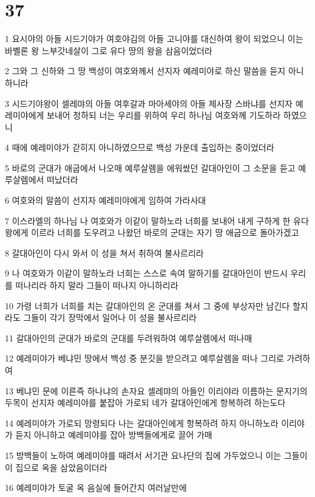 \chapter{37}

\par 1 요시야의 아들 시드기야가 여호야김의 아들 고니야를 대신하여 왕이 되었으니 이는 바벨론 왕 느부갓네살이 그로 유다 땅의 왕을 삼음이었더라
\par 2 그와 그 신하와 그 땅 백성이 여호와께서 선지자 예레미야로 하신 말씀을 듣지 아니하니라
\par 3 시드기야왕이 셀레먀의 아들 여후갈과 마아세야의 아들 제사장 스바냐를 선지자 예레미야에게 보내어 청하되 너는 우리를 위하여 우리 하나님 여호와께 기도하라 하였으니
\par 4 때에 예레미야가 갇히지 아니하였으므로 백성 가운데 출입하는 중이었더라
\par 5 바로의 군대가 애굽에서 나오매 예루살렘을 에워쌌던 갈대아인이 그 소문을 듣고 예루살렘에서 떠났더라
\par 6 여호와의 말씀이 선지자 예레미야에게 임하여 가라사대
\par 7 이스라엘의 하나님 나 여호와가 이같이 말하노라 너희를 보내어 내게 구하게 한 유다 왕에게 이르라 너희를 도우려고 나왔던 바로의 군대는 자기 땅 애굽으로 돌아가겠고
\par 8 갈대아인이 다시 와서 이 성을 쳐서 취하여 불사르리라
\par 9 나 여호와가 이같이 말하노라 너희는 스스로 속여 말하기를 갈대아인이 반드시 우리를 떠나리라 하지 말라 그들이 떠나지 아니하리라
\par 10 가령 너희가 너희를 치는 갈대아인의 온 군대를 쳐서 그 중에 부상자만 남긴다 할지라도 그들이 각기 장막에서 일어나 이 성을 불사르리라
\par 11 갈대아인의 군대가 바로의 군대를 두려워하여 예루살렘에서 떠나매
\par 12 예레미야가 베냐민 땅에서 백성 중 분깃을 받으려고 예루살렘을 떠나 그리로 가려하여
\par 13 베냐민 문에 이른즉 하나냐의 손자요 셀레먀의 아들인 이리야라 이름하는 문지기의 두목이 선지자 예레미야를 붙잡아 가로되 네가 갈대아인에게 항복하려 하는도다
\par 14 예레미야가 가로되 망령되다 나는 갈대아인에게 항복하려 하지 아니하노라 이리야가 듣지 아니하고 예레미야를 잡아 방백들에게로 끌어 가매
\par 15 방백들이 노하여 예레미야를 때려서 서기관 요나단의 집에 가두었으니 이는 그들이 이 집으로 옥을 삼았음이더라
\par 16 예레미야가 토굴 옥 음실에 들어간지 여러날만에
